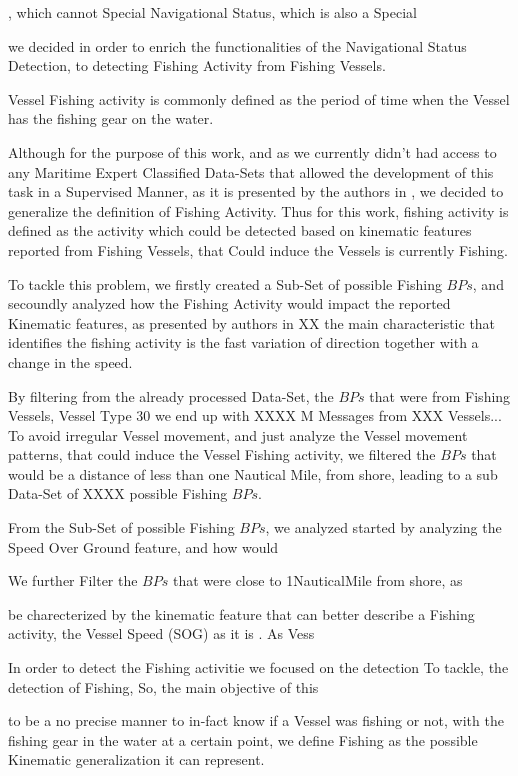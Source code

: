 , which cannot Special Navigational Status, which is also a Special 

we decided in order to enrich the functionalities of the Navigational Status Detection, to detecting Fishing Activity from Fishing Vessels. 

Vessel Fishing activity is commonly defined as the period of time when the Vessel has the fishing gear on the water. 

Although for the purpose of this work, and as we currently didn't had access to any Maritime Expert Classified Data-Sets that allowed the development of this task in a Supervised Manner, as it is presented by the authors in \cite{DeSouza2016ImprovingLearning}, we decided to generalize the definition of Fishing Activity.
Thus for this work, fishing activity is defined as the activity which could be detected based on kinematic features reported from Fishing Vessels, that Could induce the Vessels is currently Fishing. 

To tackle this problem, we firstly created a Sub-Set of possible Fishing $BPs$, and secoundly analyzed how the Fishing Activity would impact the reported Kinematic features, as presented by authors in XX the main characteristic that identifies the fishing activity is the fast variation of direction together with a change in the speed.

By filtering from the already processed Data-Set, the $BPs$ that were from Fishing Vessels, Vessel Type 30 we end up with XXXX M Messages from XXX Vessels... To avoid irregular Vessel movement,  and just analyze the Vessel movement patterns, that could induce the Vessel Fishing activity, we filtered the $BPs$ that would be a distance of less than one Nautical Mile, from shore, leading to a sub Data-Set of XXXX possible Fishing $BPs$.

From the Sub-Set of possible Fishing $BPs$, we analyzed started by analyzing the Speed Over Ground feature, and how would  



\iffalse
We further Filter the $BPs$ that were close to 1NauticalMile from shore, as 

be charecterized by the kinematic feature that can better describe a Fishing activity, the Vessel Speed (SOG) as it is . As Vess

In order to detect the Fishing activitie we focused on the detection 
To tackle, the detection of Fishing, So, the main objective of this  

to be a no precise manner to in-fact know if a Vessel was fishing or not, with the fishing gear in the water at a certain point, we define Fishing as the possible Kinematic generalization it can represent.

